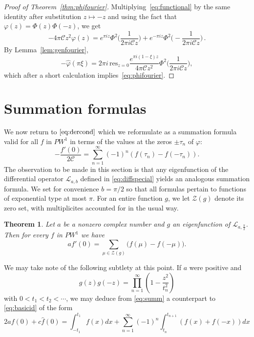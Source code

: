 \documentclass[12pt]{amsart}
\theoremstyle{plain}
\newtheorem{theorem}{Theorem}[section]
\numberwithin{equation}{section}
\theoremstyle{definition}
\renewcommand{\phi}{\varphi}
\newcommand{\Cone}{\mathscr{C}}
\begin{document}
\begin{proof}[Proof of Theorem~\ref{thm:phifourier}]
Multiplying~\eqref{eq:functional} by the same identity after substitution
$z\mapsto-z$ and using the fact that $\phi(z)=\Phi(z)\Phi(-z)$, we get
\begin{equation} \label{eq:phifunctional}
	-4\pi \Cone z^2\phi(z) =
	e^{\pi i z}\Phi^2\Big(\frac{1}{2\pi i \Cone z}\Big)+e^{-\pi i
		z}\Phi^2\Big(-\frac{1}{2\pi i \Cone z}\Big)\,.
\end{equation}
By Lemma~\ref{lem:genfourier},
	\[-\widehat{\phi}(\pi\xi) = 2\pi i\,\mathrm{res}_{z=0}\frac{e^{\pi i(1-\xi)z}}{4\pi \Cone z^2}\Phi^2\Big(\frac{1}{2\pi i\Cone z}\Big),\]
which after a short calculation implies~\eqref{eq:phifourier}.
\end{proof}


\section{Summation formulas}
\label{sec:summation}
We now return to $\eqref{eq:dercond}$ which we reformulate as a summation 
formula valid for all $f$ in $PW^1$ in terms of the values at the zeros 
$\pm \tau_n$ of $\phi$:
\[
-\frac{f'(0)}{2\Cone} = \sum_{n= 1}^\infty (-1)^n(f(\tau_n)-f(-\tau_n)).
\]
The observation to be made in this section is that any eigenfunction of the differential operator
$\mathcal{L}_{a,b}$ defined in  \eqref{eq:diffspecial} yields an
analogous summation formula. We set for convenience $b= \pi/2$ so that all formulas pertain to functions of exponential type at most $\pi$. For an entire function $g$, we let $\mathcal{Z}(g)$ denote its zero set, with multiplicites accounted for in the usual way. 
\begin{theorem}\label{thm:representation}
	Let $a$ be a nonzero complex number and $g$ an eigenfunction of 
	$\mathcal{L}_{a,\frac{\pi}2}$. Then for every 
	$f$ in $PW^1$ we have
	\begin{equation} \label{eq:summ}
	a f'(0) = \sum_{\mu \in \mathcal{Z}(g)} \big(f(\mu)-f(-\mu)\big).
	\end{equation}
	\end{theorem}
We may take note of the following subtlety at this point. If $a$ were positive and 
\[ g(z)g(-z)=\prod_{n=1}^\infty \left(1-\frac{z^2}{t_n^2}\right) \] 
with $0<t_1<t_2 < \cdots $,  we may deduce from \eqref{eq:summ} a counterpart to \eqref{eq:basicid} of the form
\begin{equation} \label{eq:L1ort}    2a f(0)+c\widehat{f}(0)=\int_{-t_1}^{t_1} f(x) dx + \sum_{n=1}^\infty (-1)^n \int_{t_n}^{t_{n+1}} (f(x)+f(-x)) dx \end{equation}
\end{document}
